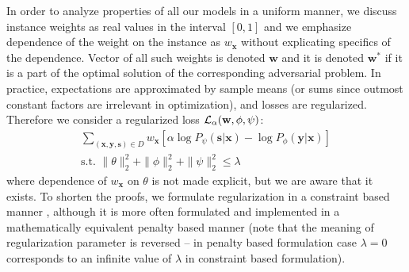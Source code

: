 \documentclass[preprint,12pt]{elsarticle}
\begin{document}
In order to analyze properties of all our models in a uniform manner, we discuss instance weights as real values in the interval $[0,1]$ and we emphasize dependence of the weight on the instance as $w_\mathbf{x}$ without explicating specifics of the dependence. Vector of all such weights is denoted $\mathbf{w}$ and it is denoted $\mathbf{w}^*$ if it is a part of the optimal solution of the corresponding adversarial problem.
In practice, expectations are approximated by sample means (or sums since outmost constant factors are irrelevant in optimization), and losses are regularized. Therefore we consider a regularized loss ${\cal L}_{\alpha}(\mathbf{w}, \phi, \psi)$:
\begin{equation}
\label{Eq:Loss-scalar-new}
\begin{split}
\sum_{(\mathbf{x},\mathbf{y},\mathbf{s})\in D} w_\mathbf{x} [\alpha\log P_{\psi}(\mathbf{s}|\mathbf{x}) -  \log P_{\phi}(\mathbf{y}|\mathbf{x})]\\
\text{s.t. }\|\theta\|^2_2+\|\phi\|^2_2+\|\psi\|^2_2\leq \lambda
\end{split}
\end{equation}
where dependence of $w_\mathbf{x}$ on $\theta$ is not made explicit, but we are aware that it exists.
To shorten the proofs, we formulate regularization in a constraint based manner \cite{tibshirani1996regression}, although it is more often formulated and implemented in a mathematically equivalent penalty based manner (note that the meaning of regularization parameter is reversed -- in penalty based formulation case $\lambda=0$ corresponds to an infinite value of $\lambda$ in constraint based formulation).
\end{document}
